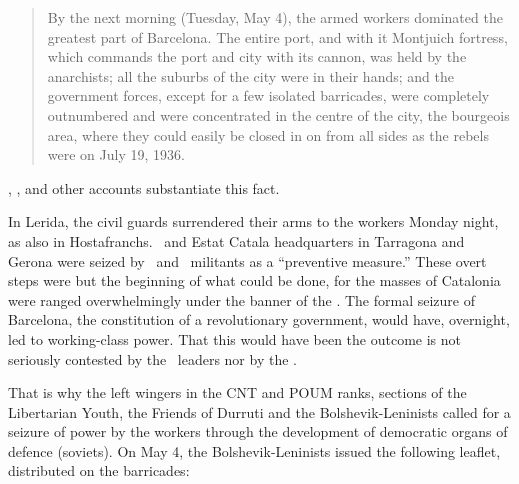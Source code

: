 \begin{quotation}
  By the next morning (Tuesday, May 4), the armed workers dominated the greatest part of Barcelona. The entire port, and with it Montjuich fortress, which commands the port and city with its cannon, was held by the anarchists; all the suburbs of the city were in their hands; and the government forces, except for a few isolated barricades, were completely outnumbered and were concentrated in the centre of the city, the bourgeois area, where they could easily be closed in on from all sides as the rebels were on July 19, 1936.
\end{quotation}

\CNT, \POUM, and other accounts substantiate this fact.

In Lerida, the civil guards surrendered their arms to the workers Monday night, as also in Hostafranchs. \PSUC\ and Estat Catala headquarters in Tarragona and Gerona were seized by \POUM\ and \CNT\ militants as a ``preventive measure.'' These overt steps were but the beginning of what could be done, for the masses of Catalonia were ranged overwhelmingly under the banner of the \CNT. The formal seizure of Barcelona, the constitution of a revolutionary government, would have, overnight, led to working-class power. That this would have been the outcome is not seriously contested by the \CNT\ leaders nor by the \POUM.

That is why the left wingers in the CNT and POUM ranks, sections of the Libertarian Youth, the Friends of Durruti and the Bolshevik-Leninists called for a seizure of power by the workers through the development of democratic organs of defence (soviets). On May 4, the Bolshevik-Leninists issued the following leaflet, distributed on the barricades:

\medskip

